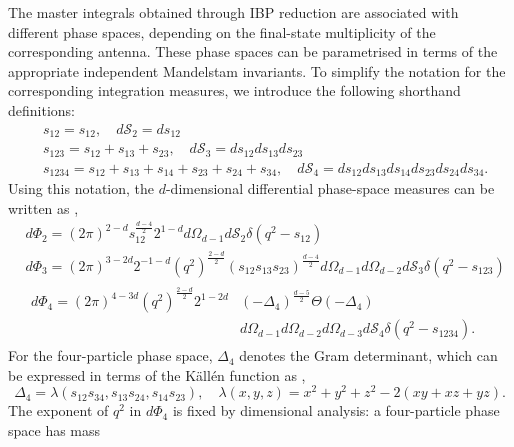 The master integrals obtained through IBP reduction are associated with different phase spaces,
depending on the final-state multiplicity of the corresponding antenna. These phase spaces can be
parametrised in terms of the appropriate independent Mandelstam invariants. To simplify the notation
for the corresponding integration measures, we introduce the following shorthand definitions:
\begin{equation}
    \begin{split}
        &s_{12}=s_{12},\quad d\mathcal S_2 = ds_{12}\\
        &s_{123} = s_{12}+s_{13}+s_{23},\quad d\mathcal S_3 = ds_{12}ds_{13}ds_{23}\\
        &s_{1234} = s_{12}+s_{13}+s_{14}+s_{23}+s_{24}+s_{34},\quad d\mathcal S_4 = ds_{12}ds_{13}ds_{14}ds_{23}ds_{24}ds_{34}.
    \end{split}
\end{equation}
Using this notation, the $d$-dimensional differential phase-space measures can be written as
\cite{GehrmannDeRidder0311276,Anastasiou:2002yz},
\begin{equation}\label{eq:phaseSpaces}
    \begin{split}
        &d\Phi_2 = (2\pi)^{2-d}s_{12}^{\frac{d-4}{2}}2^{1-d}d\Omega_{d-1}d\mathcal S_2\delta\!\left(q^2-s_{12}\right)\\
        &d\Phi_3 = (2\pi)^{3-2d}2^{-1-d}\!\left(q^2\right)^{\frac{2-d}{2}}(s_{12}s_{13}s_{23})^{\frac{d-4}{2}}d\Omega_{d-1}d\Omega_{d-2}d\mathcal S_3\delta\!\left(q^2-s_{123}\right)\\
        &\begin{split}
            d\Phi_4 = (2\pi)^{4-3d}\!\left(q^2\right)^{\frac{2-d}{2}}2^{1-2d}&(-\Delta_4)^{\frac{d-5}{2}}\Theta(-\Delta_4)\\ &d\Omega_{d-1}d\Omega_{d-2}d\Omega_{d-3}d\mathcal S_4\delta\!\left(q^2-s_{1234}\right).
         \end{split}
    \end{split}
\end{equation}
For the four-particle phase space, $\Delta_4$ denotes the Gram determinant, which can be expressed in terms of the Källén function as
\cite{GehrmannDeRidder0311276,Anastasiou:2002yz},
\begin{equation}
    \Delta_4=\lambda(s_{12}s_{34}, s_{13}s_{24}, s_{14}s_{23}),\quad \lambda(x, y, z) = x^2+y^2+z^2-2(xy+xz+yz).
\end{equation}
The exponent of $q^2$ in $d\Phi_4$ is fixed by dimensional analysis: a four-particle phase space has mass
